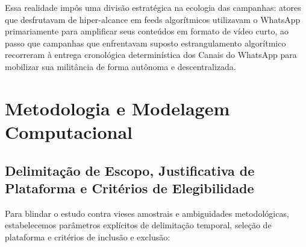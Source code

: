 \documentclass[12pt]{article}
\begin{document}
Essa realidade impôs uma divisão estratégica na ecologia das campanhas: atores que desfrutavam de hiper-alcance em feeds algorítmicos utilizavam o WhatsApp primariamente para amplificar seus conteúdos em formato de vídeo curto, ao passo que campanhas que enfrentavam suposto estrangulamento algorítmico recorreram à entrega cronológica determinística dos Canais do WhatsApp para mobilizar sua militância de forma autônoma e descentralizada.

\section{Metodologia e Modelagem Computacional}\label{sec:metodologia}

\subsection{Delimitação de Escopo, Justificativa de Plataforma e Critérios de Elegibilidade}

Para blindar o estudo contra vieses amostrais e ambiguidades metodológicas, estabelecemos parâmetros explícitos de delimitação temporal, seleção de plataforma e critérios de inclusão e exclusão:
\end{document}
